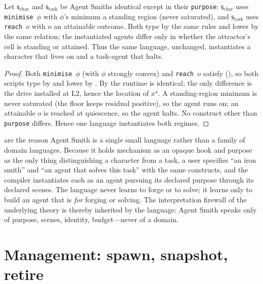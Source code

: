 \documentclass[11pt,twocolumn,a4paper]{article}
\newcommand{\Purp}{x^{\star}}
\newcommand{\spec}{\mathsf{s}}         %
\begin{document}
\begin{theorem}
\label{thm:regimes}
Let $\spec_{\mathrm{char}}$ and $\spec_{\mathrm{task}}$ be Agent Smiths
identical except in their \texttt{purpose}: $\spec_{\mathrm{char}}$ uses
\texttt{minimise }$\phi$ with $\phi$'s minimum a standing region (never
saturated), and $\spec_{\mathrm{task}}$ uses \texttt{reach }$o$ with $o$ an
attainable outcome. Both type by the same rules and lower by the same
relation; the instantiated agents differ only in whether the attractor's cell
is standing or attained. Thus the same language, unchanged, instantiates a
character that lives on and a task-agent that halts.
\end{theorem}

\begin{proof}
Both \texttt{minimise }$\phi$ (with $\phi$ strongly convex) and \texttt{reach
}$o$ satisfy  (), so both scripts type
by  and lower by . By 
the runtime is identical; the only difference is the drive installed at L2,
hence the location of $\Purp$. A standing-region minimum is never saturated
(the floor keeps residual positive), so the agent runs on; an attainable $o$
is reached at quiescence, so the agent halts. No construct other than
\texttt{purpose} differs. Hence one language instantiates both regimes.
\end{proof}

\begin{remark}
\label{rem:whole-point}
 are the reason Agent Smith is a single small
language rather than a family of domain languages. Because it holds mechanism
as an opaque hook and purpose as the only thing distinguishing a character
from a task, a user specifies ``an iron smith'' and ``an agent that solves
this task'' with the same constructs, and the compiler instantiates each as an
agent pursuing its declared purpose through its declared scenes. The language
never learns to forge or to solve; it learns only to build an agent that is
\emph{for} forging or solving. The interpretation firewall of the underlying
theory is thereby inherited by the language: Agent Smith speaks only of
purpose, scenes, identity, budget---never of a domain.
\end{remark}

\section{Management: spawn, snapshot, retire}
\label{sec:lifecycle}
\end{document}
